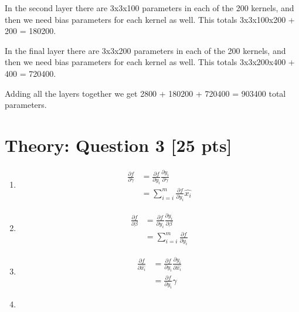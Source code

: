 \documentclass{article}
\begin{document}
In the second layer there are 3x3x100 parameters in each of the 200 kernels, and then we need bias parameters for each kernel as well. This totals 3x3x100x200 + 200 = 180200. 

In the final layer there are 3x3x200 parameters in each of the 200 kernels, and then we need bias parameters for each kernel as well. This totals 3x3x200x400 + 400 = 720400. 

Adding all the layers together we get 2800 + 180200 + 720400 = 903400 total parameters.

\section{Theory: Question 3 [25 pts]}

\begin{enumerate}[label=\alph*.]
    \item
    \begin{equation*}
        \begin{aligned}
            \frac{\partial f}{\partial \gamma} &= \frac{\partial f}{\partial y_i} \frac{\partial y_i}{\partial \gamma} \\
            &= \sum_{i=i}^{m}\frac{\partial f}{\partial y_i} \widehat{x_i}
        \end{aligned}
    \end{equation*}
    \item        
    \begin{equation*}
        \begin{aligned}
            \frac{\partial f}{\partial \beta} &= \frac{\partial f}{\partial y_i} \frac{\partial y_i}{\partial \beta} \\
            &= \sum_{i=i}^{m}\frac{\partial f}{\partial y_i}
        \end{aligned}
    \end{equation*}  
    \item        
    \begin{equation*}
        \begin{aligned}
            \frac{\partial f}{\partial \widehat{x_i}} &= \frac{\partial f}{\partial y_i} \frac{\partial y_i}{\partial \widehat{x_i}} \\
            &= \frac{\partial f}{\partial y_i} \gamma
        \end{aligned}
    \end{equation*}  
    \item 
    \begin{equation*}
        \begin{aligned}

\end{aligned}
\end{equation*}
\end{enumerate}
\end{document}

